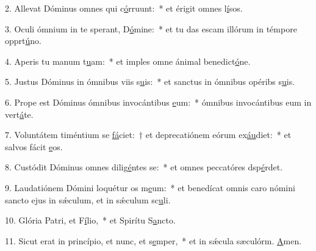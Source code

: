 2. Allevat Dóminus omnes qui c\uline{ó}rruunt:~* et érigit omnes l\uline{í}sos.\par 
3. Oculi ómnium in te sperant, D\uline{ó}mine:~* et tu das escam illórum in témpore opprt\uline{ú}no.\par 
4. Aperis tu manum t\uline{u}am:~* et imples omne ánimal benedict\uline{ó}ne.\par 
5. Justus Dóminus in ómnibus viis s\uline{u}is:~* et sanctus in ómnibus opéribs s\uline{u}is.\par 
6. Prope est Dóminus ómnibus invocántibus \uline{e}um:~* ómnibus invocántibus eum in vert\uline{á}te.\par 
7. Voluntátem timéntium se \uline{fá}ciet:~† et deprecatiónem eórum ex\uline{áu}diet:~* et salvos fácit \uline{e}os.\par 
8. Custódit Dóminus omnes dilig\uline{é}ntes se:~* et omnes peccatóres dsp\uline{é}rdet.\par 
9. Laudatiónem Dómini loquétur os m\uline{e}um:~* et benedícat omnis caro nómini sancto ejus in sǽculum, et in sǽculum sc\uline{u}li.\par 
10. Glória Patri, et F\uline{í}lio,~* et Spirítu S\uline{a}ncto.\par 
11. Sicut erat in princípio, et nunc, et s\uline{e}mper,~* et in sǽcula sæculórm. \uline{A}men.\par 

